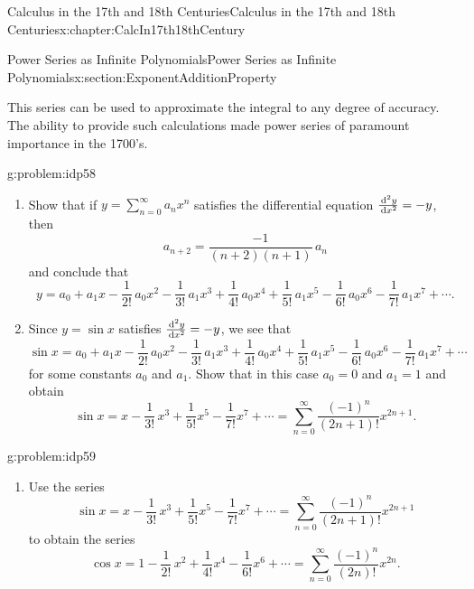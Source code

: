 \begin{chapterptx}{Calculus in the 17th and 18th Centuries}{}{Calculus in the 17th and 18th Centuries}{}{}{x:chapter:CalcIn17th18thCentury}
\begin{sectionptx}{Power Series as Infinite Polynomials}{}{Power Series as Infinite Polynomials}{}{}{x:section:ExponentAdditionProperty}
		\par
		This series can be used to approximate the integral to any degree of accuracy. The ability to provide such calculations made power series of paramount importance in the 1700's.%
		\begin{problem}{}{g:problem:idp58}%
			\begin{enumerate}[font=\bfseries,label=(\alph*),ref=\alph*]
				\item{}Show that if \(y=\sum_{n=0}^\infty a_nx^n\) satisfies the differential equation \(\frac{\,{\rm d}^2y}{\,{\rm d} x^2}=-y\), then%
				\begin{equation*}
					a_{n+2}=\frac{-1}{\left(n+2\right)\left(n+1\right)}\,a_n
				\end{equation*}
				and conclude that%
				\begin{equation*}
					y=a_0+a_1x-\frac{1}{2!}\,a_0x^2-\frac{1}{3!}\,a_1x^3+\frac{1}{4!}\,a_0x^4+\frac{1}{5!}\,a_1x^5-\frac{1}{6!}\,a_0x^6-\frac{1}{7!}\,a_1x^7+\cdots\text{.}
				\end{equation*}
				\item{}Since \(y=\sin x\) satisfies \(\frac{\,{\rm d}^2y}{\,{\rm d}
						x^2}=-y\), we see that%
				\begin{equation*}
					\sin x=a_0+a_1x-\frac{1}{2!}\,a_0x^2-\frac{1}{3!}\,a_1x^3+\frac{1}{4!}\,a_0x^4+\frac{1}{5!}\,a_1x^5-\frac{1}{6!}\,a_0x^6-\frac{1}{7!}\,a_1x^7+\cdots
				\end{equation*}
				for some constants \(a_0\) and \(a_1\).  Show that in this case \(a_0=0\) and \(a_1=1\) and obtain%
				\begin{equation*}
					\sin x=x-\frac{1}{3!}\,x^3+\frac{1}{5!}x^5-\frac{1}{7!}x^7+\cdots=\sum_{n=0}^\infty\frac{\left(-1\right)^n}{\left(2n+1\right)!}x^{2n+1}\text{.}
				\end{equation*}
			\end{enumerate}
		\end{problem}
		\begin{problem}{}{g:problem:idp59}%
			\begin{enumerate}[font=\bfseries,label=(\alph*),ref=\alph*]
				\item{}Use the series%
				\begin{equation*}
					\sin x=x-\frac{1}{3!}\,x^3+\frac{1}{5!}x^5-\frac{1}{7!}x^7+\cdots=\sum_{n=0}^\infty\frac{\left(-1\right)^n}{\left(2n+1\right)!}x^{2n+1}
				\end{equation*}
				to obtain the series%
				\begin{equation*}
					\cos x=1-\frac{1}{2!}\,x^2+\frac{1}{4!}x^4-\frac{1}{6!}x^6+\cdots=\sum_{n=0}^\infty\frac{\left(-1\right)^n}{\left(2n\right)!}x^{2n}\text{.}

\end{equation*}
\end{enumerate}
\end{problem}
\end{sectionptx}
\end{chapterptx}
